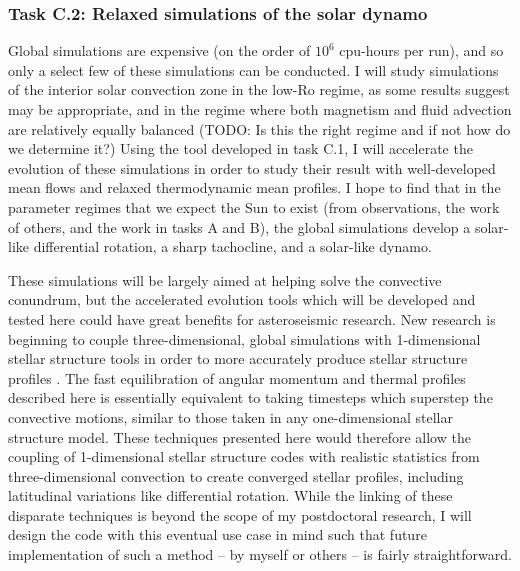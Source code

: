 \documentclass[aasms,12pt]{article}
\begin{document}
\subsubsection{Task C.2: Relaxed simulations of the solar dynamo}
Global simulations are expensive (on the order of $10^6$ cpu-hours per run), and so only a select few of these simulations can be conducted.
I will study simulations of the interior solar convection zone in the low-Ro regime, as some results suggest may be appropriate, and in the regime where both magnetism and fluid advection are relatively equally balanced (TODO: Is this the right regime and if not how do we determine it?)
Using the tool developed in task C.1, I will accelerate the evolution of these simulations in order to study their result with well-developed mean flows and relaxed thermodynamic mean profiles.
I hope to find that in the parameter regimes that we expect the Sun to exist (from observations, the work of others, and the work in tasks A and B), the global simulations develop a solar-like differential rotation, a sharp tachocline, and a solar-like dynamo.

These simulations will be largely aimed at helping solve the convective conundrum, but the accelerated evolution tools which will be developed and tested here could have great benefits for asteroseismic research.
New research is beginning to couple three-dimensional, global simulations with 1-dimensional stellar structure tools in order to more accurately produce stellar structure profiles \citep{jorgensen&weiss2019}.
The fast equilibration of angular momentum and thermal profiles described here is essentially equivalent to taking timesteps which superstep the convective motions, similar to those taken in any one-dimensional stellar structure model.
These techniques presented here would therefore allow the coupling of 1-dimensional stellar structure codes with realistic statistics from three-dimensional convection to create converged stellar profiles, including latitudinal variations like differential rotation.
While the linking of these disparate techniques is beyond the scope of my postdoctoral research, I will design the code with this eventual use case in mind such that future implementation of such a method -- by myself or others -- is fairly straightforward.
\end{document}
